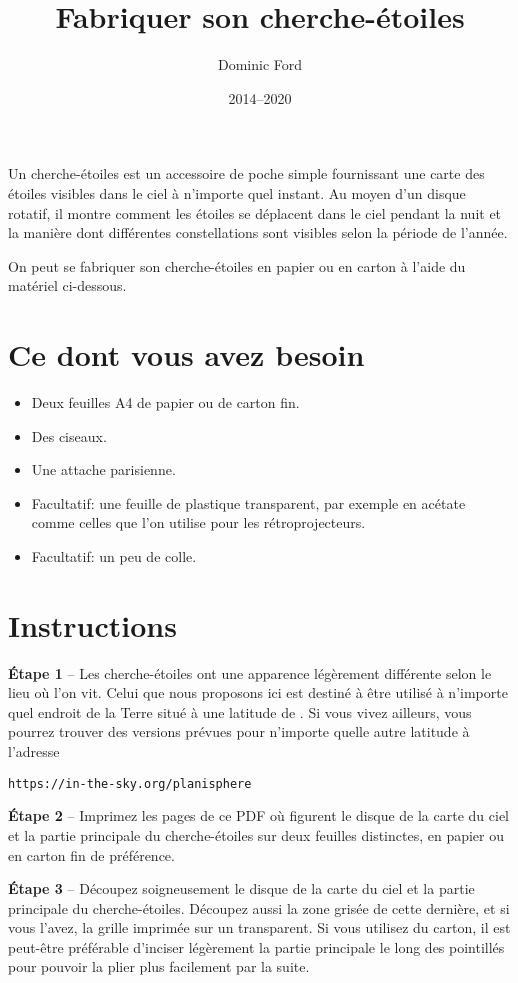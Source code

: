 \documentclass[a4paper,onecolumn,10pt]{article}
\title{Fabriquer son cherche-étoiles}
\author{Dominic Ford}
\date{2014--2020}
\begin{document}
\maketitle
\setcounter{footnote}{1}

Un cherche-étoiles est un accessoire de poche simple fournissant une carte des étoiles visibles dans le ciel à n’importe quel instant. Au moyen d’un disque rotatif, il montre comment les étoiles se déplacent dans le ciel pendant la nuit et la manière dont différentes constellations sont visibles selon la période de l’année.

On peut se fabriquer son cherche-étoiles en papier ou en carton à l’aide du matériel ci-dessous.

\section*{Ce dont vous avez besoin}

\begin{itemize}
\item Deux feuilles A4 de papier ou de carton fin.
\item Des ciseaux.
\item Une attache parisienne.
\item Facultatif: une feuille de plastique transparent, par exemple en acétate comme celles que l’on utilise pour les rétroprojecteurs.
\item Facultatif: un peu de colle.
\end{itemize}

\section*{Instructions}

{\bf Étape 1} -- Les cherche-étoiles ont une apparence légèrement différente selon le lieu où l’on vit. Celui que nous proposons ici est destiné à être utilisé à n’importe quel endroit de la Terre situé à une latitude de . Si vous vivez ailleurs, vous pourrez trouver des versions prévues pour n’importe quelle autre latitude à l’adresse

\centerline{\tt https://in-the-sky.org/planisphere}

{\bf Étape 2} -- Imprimez les pages de ce PDF où figurent le disque de la carte du ciel et la partie principale du cherche-étoiles sur deux feuilles distinctes, en papier ou en carton fin de préférence.

{\bf Étape 3} -- Découpez soigneusement le disque de la carte du ciel et la partie principale du cherche-étoiles. Découpez aussi la zone grisée de cette dernière, et si vous l’avez, la grille imprimée sur un transparent. Si vous utilisez du carton, il est peut-être préférable d’inciser légèrement la partie principale le long des pointillés pour pouvoir la plier plus facilement par la suite.
\end{document}
